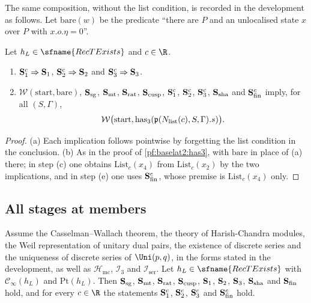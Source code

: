 The same composition, without the list condition, is recorded in the development as follows. Let
$\mathrm{bare}(w)$ be the predicate ``there are $P$ and an unlocalised state $x$ over $P$ with
$x.o.\eta=0$''.

\begin{proposition}\label{pf:baselat2:stepspin}
Let $h_L\in\sfname{RecTExists}$ and $c\in\R$.
\begin{enumerate}[label=(\alph*)]
\item $\mathbf{S}_{\mathrm{1}}^{c}\Rightarrow\mathbf{S}_{\mathrm{1}}$, $\mathbf{S}_{\mathrm{2}}^{c}\Rightarrow\mathbf{S}_{\mathrm{2}}$ and
  $\mathbf{S}_{\mathrm{3}}^{c}\Rightarrow\mathbf{S}_{\mathrm{3}}$.
\item $\mathcal{W}(\mathrm{start},\mathrm{bare})$, $\mathbf{S}_{\mathrm{sg}}$, $\mathbf{S}_{\mathrm{mt}}$,
  $\mathbf{S}_{\mathrm{rat}}$, $\mathbf{S}_{\mathrm{cusp}}$, $\mathbf{S}_{\mathrm{1}}^{c}$, $\mathbf{S}_{\mathrm{2}}^{c}$, $\mathbf{S}_{\mathrm{3}}^{c}$,
  $\mathbf{S}_{\mathrm{sha}}$ and $\mathbf{S}_{\mathrm{fin}}^{c}$ imply, for all $(S,\Gamma)$,
  \[
    \mathcal{W}\bigl(\mathrm{start},\mathrm{has}_3(\mathfrak{p}(N_{\mathrm{list}}(c),S,\Gamma).s)\bigr).
  \]
\end{enumerate}
\end{proposition}

\begin{proof}
(a) Each implication follows pointwise by forgetting the list condition in the conclusion. (b) As in the
proof of \cref{pf:baselat2:has3}, with $\mathrm{bare}$ in place of (a) there; in step (c) one obtains
$\mathrm{List}_c(x_4)$ from $\mathrm{List}_c(x_2)$ by the two implications, and in step (e) one uses
$\mathbf{S}_{\mathrm{fin}}^{c}$, whose premise is $\mathrm{List}_c(x_4)$ only.
\end{proof}

\subsection{All stages at members}\label{sec:pf:baselat2:allstages}

\begin{theorem}\label{pf:baselat2:allstages}
Assume the Casselman--Wallach theorem, the theory of Harish-Chandra modules, the Weil representation of
unitary dual pairs, the existence of discrete series and the uniqueness of discrete series of
$\Uni(p,q)$, in the forms stated in the development, as well as $\mathcal{H}_{\mathrm{mc}}$, $\mathcal{I}_3$ and
$\mathcal{I}_{\mathrm{ser}}$. Let $h_L\in\sfname{RecTExists}$ with $\mathcal{C}_{\infty}(h_L)$ and
$\mathrm{Pt}(h_L)$. Then $\mathbf{S}_{\mathrm{sg}}$, $\mathbf{S}_{\mathrm{mt}}$, $\mathbf{S}_{\mathrm{rat}}$,
$\mathbf{S}_{\mathrm{cusp}}$, $\mathbf{S}_{\mathrm{1}}$, $\mathbf{S}_{\mathrm{2}}$, $\mathbf{S}_{\mathrm{3}}$, $\mathbf{S}_{\mathrm{sha}}$ and
$\mathbf{S}_{\mathrm{fin}}$ hold, and for every $c\in\R$ the statements $\mathbf{S}_{\mathrm{1}}^{c}$, $\mathbf{S}_{\mathrm{2}}^{c}$,
$\mathbf{S}_{\mathrm{3}}^{c}$ and $\mathbf{S}_{\mathrm{fin}}^{c}$ hold.
\end{theorem}

